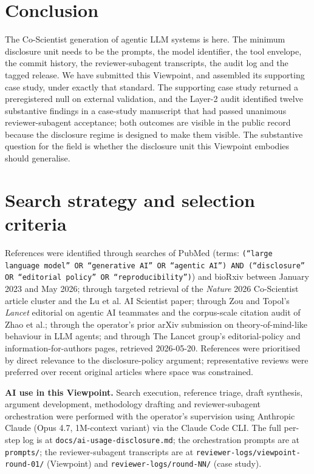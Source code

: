 \documentclass[11pt,a4paper]{article}
\begin{document}
\section{Conclusion}\label{sec:conclude}

The Co-Scientist generation of agentic LLM systems is here. The minimum disclosure unit needs to be the prompts, the model identifier, the tool envelope, the commit history, the reviewer-subagent transcripts, the audit log and the tagged release. We have submitted this Viewpoint, and assembled its supporting case study, under exactly that standard. The supporting case study returned a preregistered null on external validation, and the Layer-2 audit identified twelve substantive findings in a case-study manuscript that had passed unanimous reviewer-subagent acceptance; both outcomes are visible in the public record because the disclosure regime is designed to make them visible. The substantive question for the field is whether the disclosure unit this Viewpoint embodies should generalise.

\section*{Search strategy and selection criteria}

References were identified through searches of PubMed (terms: \texttt{(``large language model'' OR ``generative AI'' OR ``agentic AI'') AND (``disclosure'' OR ``editorial policy'' OR ``reproducibility'')}) and bioRxiv between January 2023 and May 2026; through targeted retrieval of the \textit{Nature} 2026 Co-Scientist article cluster and the Lu et al. AI Scientist paper; through Zou and Topol's \textit{Lancet} editorial on agentic AI teammates and the corpus-scale citation audit of Zhao et al.; through the operator's prior arXiv submission on theory-of-mind-like behaviour in LLM agents\citep{lintom2026}; and through The Lancet group's editorial-policy and information-for-authors pages, retrieved 2026-05-20. References were prioritised by direct relevance to the disclosure-policy argument; representative reviews were preferred over recent original articles where space was constrained.

\textbf{AI use in this Viewpoint.} Search execution, reference triage, draft synthesis, argument development, methodology drafting and reviewer-subagent orchestration were performed with the operator's supervision using Anthropic Claude (Opus 4.7, 1M-context variant) via the Claude Code CLI. The full per-step log is at \texttt{docs/ai-usage-disclosure.md}; the orchestration prompts are at \texttt{prompts/}; the reviewer-subagent transcripts are at \texttt{reviewer-logs/viewpoint-round-01/} (Viewpoint) and \texttt{reviewer-logs/round-NN/} (case study).
\end{document}
